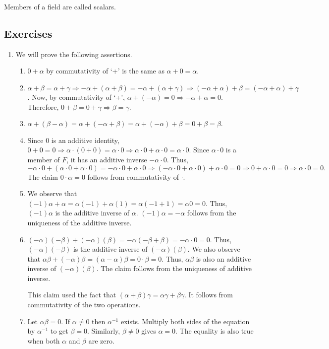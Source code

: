 \begin{rem}
Members of a field are called scalars.
\end{rem}

\subsection{Exercises}
\begin{enumerate}
\item We will prove the following assertions.
\begin{enumerate}
\item $0 + \alpha$ by commutativity of `+' is the same as $\alpha + 0
= \alpha$.
\item $\alpha + \beta = \alpha + \gamma \Rightarrow -\alpha + (\alpha
+ \beta) = -\alpha + (\alpha + \gamma) \Rightarrow (-\alpha + \alpha)
+ \beta = (-\alpha + \alpha) + \gamma$. Now, by commutativity of `+',
$\alpha + (-\alpha) = 0 \Rightarrow -\alpha + \alpha = 0$. Therefore,
$0 + \beta = 0 + \gamma \Rightarrow \beta = \gamma$.
\item $\alpha + (\beta - \alpha) = \alpha + (-\alpha + \beta) = 
\alpha + (-\alpha) + \beta = 0 + \beta = \beta$.
\item Since $0$ is an additive identity, $0 + 0 = 0 \Rightarrow
\alpha\cdot(0 + 0) = \alpha\cdot 0 \Rightarrow \alpha\cdot 0 + 
\alpha\cdot 0 = \alpha\cdot 0$. Since $\alpha\cdot 0$ is a member of
$F$, it has an additive inverse $-\alpha\cdot 0$. Thus,
$-\alpha\cdot 0 + (\alpha\cdot 0 + \alpha\cdot 0) = 
-\alpha\cdot 0 + \alpha\cdot 0 \Rightarrow
(-\alpha\cdot 0 + \alpha\cdot 0) + \alpha\cdot 0 = 0 \Rightarrow
0 + \alpha\cdot 0 = 0 \Rightarrow \alpha\cdot 0 = 0.$
The claim $0\cdot\alpha = 0$ follows from commutativity of $\cdot$.
\item We observe that $(-1)\alpha + \alpha = \alpha(-1) + \alpha(1)
= \alpha(-1 + 1) = \alpha 0 = 0$. Thus, $(-1)\alpha$ is the additive
inverse of $\alpha$. $(-1)\alpha = -\alpha$ follows from the
uniqueness of the additive inverse.
\item $(-\alpha)(-\beta) + (-\alpha)(\beta) = -\alpha(-\beta + \beta)
= -\alpha \cdot 0 = 0$. Thus, $(-\alpha)(-\beta)$ is the additive 
inverse of $(-\alpha)(\beta)$. We also observe that $\alpha\beta + 
(-\alpha)\beta = (\alpha - \alpha)\beta = 0\cdot\beta = 0$. Thus,
$\alpha\beta$ is also an additive inverse of $(-\alpha)(\beta)$. The
claim follows from the uniqueness of additive inverse. 

This claim used the fact that $(\alpha + \beta)\gamma = \alpha\gamma
+ \beta\gamma$. It follows from commutativity of the two operations.

\item Let $\alpha\beta = 0$. If $\alpha \ne 0$ then $\alpha^{-1}$
exists. Multiply both sides of the equation by $\alpha^{-1}$ to get
$\beta = 0$. Similarly, $\beta \ne 0$ gives $\alpha = 0$. The equality
is also true when both $\alpha$ and $\beta$ are zero.
\end{enumerate}
\end{enumerate}

